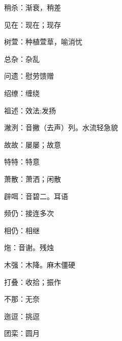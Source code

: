 稍杀：渐衰，稍差

见在：现在；现存

树萱：种植萱䓍，喻消忧

总杂：杂乱

问遗：慰劳馈赠

绍缭：缠绕

祖述：效法;发扬

潎洌：音撇（去声）列。水流轻急貌

故故：屡屡；故意

特特：特意

萧散：萧洒；闲散

辟咡：音碧二。耳语

频仍：接连多次

相仍：相继

炧：音谢。残烛

木强：木降。麻木僵硬

打叠：收拾；振作

不那：无奈

迤逗：挑逗

团栾：圆月

\newpage